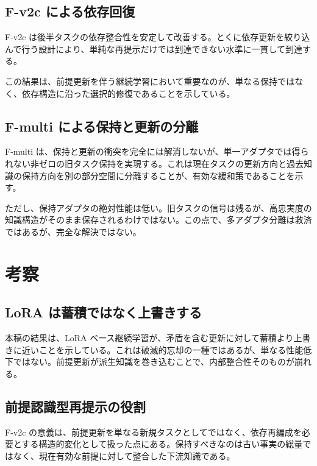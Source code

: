 \documentclass[12pt,a4paper]{article}
\begin{document}
\subsection{F-v2c による依存回復}\label{f-v2c-ux306bux3088ux308bux4f9dux5b58ux56deux5fa9}

F-v2c は後半タスクの依存整合性を安定して改善する。とくに依存更新を絞り込んで行う設計により、単純な再提示だけでは到達できない水準に一貫して到達する。

この結果は、前提更新を伴う継続学習において重要なのが、単なる保持ではなく、依存構造に沿った選択的修復であることを示している。

\subsection{F-multi による保持と更新の分離}\label{f-multi-ux306bux3088ux308bux4fddux6301ux3068ux66f4ux65b0ux306eux5206ux96e2}

F-multi は、保持と更新の衝突を完全には解消しないが、単一アダプタでは得られない非ゼロの旧タスク保持を実現する。これは現在タスクの更新方向と過去知識の保持方向を別の部分空間に分離することが、有効な緩和策であることを示す。

ただし、保持アダプタの絶対性能は低い。旧タスクの信号は残るが、高忠実度の知識構造がそのまま保存されるわけではない。この点で、多アダプタ分離は救済ではあるが、完全な解決ではない。

\section{考察}\label{ux8003ux5bdf}

\subsection{LoRA は蓄積ではなく上書きする}\label{lora-ux306fux84c4ux7a4dux3067ux306fux306aux304fux4e0aux66f8ux304dux3059ux308b}

本稿の結果は、LoRA ベース継続学習が、矛盾を含む更新に対して蓄積より上書きに近いことを示している。これは破滅的忘却の一種ではあるが、単なる性能低下ではない。前提更新が派生知識を巻き込むことで、内部整合性そのものが崩れる。

\subsection{前提認識型再提示の役割}\label{ux524dux63d0ux8a8dux8b58ux578bux518dux63d0ux793aux306eux5f79ux5272}

F-v2c の意義は、前提更新を単なる新規タスクとしてではなく、依存再編成を必要とする構造的変化として扱った点にある。保持すべきなのは古い事実の総量ではなく、現在有効な前提に対して整合した下流知識である。
\end{document}
